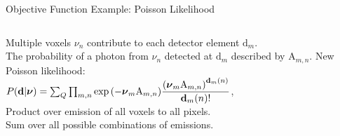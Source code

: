 \begin{frame}[c]{Objective Function Example: Poisson Likelihood}
    \begin{columns}[c,onlytextwidth]
        \begin{column}[c]{0.6\textwidth}
            Multiple voxels $\nu_{n}$ contribute to each detector element $\text{d}_{m}$.\\[0.2cm]
            The probability of a photon from $\nu_{n}$ detected at $\text{d}_{m}$ described by $\text{A}_{m,n}$.
            New Poisson likelihood:\\[0.2cm]

            $P(\mathbf{d}|\text{\boldmath$\nu$}) = \sum_{Q}\prod_{m,n} \exp{\left(-\text{\boldmath$\nu$}_{m}\text{A}_{m,n}\right)} \dfrac{\left(\text{\boldmath$\nu$}_{m}\text{A}_{m,n}\right)^{\mathbf{d}_{m}(n)}}{{\mathbf{d}_{m}(n)!}}$,\\[0.2cm]

            Product over emission of all voxels to all pixels.\\[0.2cm]
            Sum over all possible combinations of emissions.


\end{column}
\end{columns}
\end{frame}
